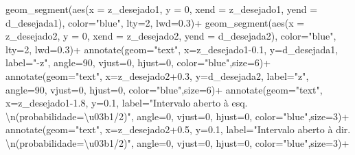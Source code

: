 \documentclass[
]{book}
\newenvironment{Shaded}{\begin{snugshade}}{\end{snugshade}}
\newcommand{\AttributeTok}[1]{\textcolor[rgb]{0.77,0.63,0.00}{#1}}
\newcommand{\DecValTok}[1]{\textcolor[rgb]{0.00,0.00,0.81}{#1}}
\newcommand{\FloatTok}[1]{\textcolor[rgb]{0.00,0.00,0.81}{#1}}
\newcommand{\FunctionTok}[1]{\textcolor[rgb]{0.00,0.00,0.00}{#1}}
\newcommand{\NormalTok}[1]{#1}
\newcommand{\SpecialCharTok}[1]{\textcolor[rgb]{0.00,0.00,0.00}{#1}}
\newcommand{\StringTok}[1]{\textcolor[rgb]{0.31,0.60,0.02}{#1}}
\begin{document}
\begin{Shaded}
\begin{Highlighting}[]
  \FunctionTok{geom\_segment}\NormalTok{(}\FunctionTok{aes}\NormalTok{(}\AttributeTok{x =}\NormalTok{ z\_desejado1, }\AttributeTok{y =} \DecValTok{0}\NormalTok{, }\AttributeTok{xend =}\NormalTok{ z\_desejado1, }\AttributeTok{yend =}\NormalTok{ d\_desejada1), }\AttributeTok{color=}\StringTok{"blue"}\NormalTok{, }\AttributeTok{lty=}\DecValTok{2}\NormalTok{, }\AttributeTok{lwd=}\FloatTok{0.3}\NormalTok{)}\SpecialCharTok{+}
  \FunctionTok{geom\_segment}\NormalTok{(}\FunctionTok{aes}\NormalTok{(}\AttributeTok{x =}\NormalTok{ z\_desejado2, }\AttributeTok{y =} \DecValTok{0}\NormalTok{, }\AttributeTok{xend =}\NormalTok{ z\_desejado2, }\AttributeTok{yend =}\NormalTok{ d\_desejada2), }\AttributeTok{color=}\StringTok{"blue"}\NormalTok{, }\AttributeTok{lty=}\DecValTok{2}\NormalTok{, }\AttributeTok{lwd=}\FloatTok{0.3}\NormalTok{)}\SpecialCharTok{+}
  \FunctionTok{annotate}\NormalTok{(}\AttributeTok{geom=}\StringTok{"text"}\NormalTok{, }\AttributeTok{x=}\NormalTok{z\_desejado1}\FloatTok{{-}0.1}\NormalTok{, }\AttributeTok{y=}\NormalTok{d\_desejada1, }\AttributeTok{label=}\StringTok{"{-}z"}\NormalTok{, }\AttributeTok{angle=}\DecValTok{90}\NormalTok{, }\AttributeTok{vjust=}\DecValTok{0}\NormalTok{, }\AttributeTok{hjust=}\DecValTok{0}\NormalTok{, }\AttributeTok{color=}\StringTok{"blue"}\NormalTok{,}\AttributeTok{size=}\DecValTok{6}\NormalTok{)}\SpecialCharTok{+}
  \FunctionTok{annotate}\NormalTok{(}\AttributeTok{geom=}\StringTok{"text"}\NormalTok{, }\AttributeTok{x=}\NormalTok{z\_desejado2}\FloatTok{+0.3}\NormalTok{, }\AttributeTok{y=}\NormalTok{d\_desejada2, }\AttributeTok{label=}\StringTok{"z"}\NormalTok{, }\AttributeTok{angle=}\DecValTok{90}\NormalTok{, }\AttributeTok{vjust=}\DecValTok{0}\NormalTok{, }\AttributeTok{hjust=}\DecValTok{0}\NormalTok{, }\AttributeTok{color=}\StringTok{"blue"}\NormalTok{,}\AttributeTok{size=}\DecValTok{6}\NormalTok{)}\SpecialCharTok{+}
  \FunctionTok{annotate}\NormalTok{(}\AttributeTok{geom=}\StringTok{"text"}\NormalTok{, }\AttributeTok{x=}\NormalTok{z\_desejado1}\FloatTok{{-}1.8}\NormalTok{, }\AttributeTok{y=}\FloatTok{0.1}\NormalTok{, }\AttributeTok{label=}\StringTok{"Intervalo aberto à esq. }\SpecialCharTok{\textbackslash{}n}\StringTok{(probabilidade=\textbackslash{}u03b1/2)"}\NormalTok{, }\AttributeTok{angle=}\DecValTok{0}\NormalTok{, }\AttributeTok{vjust=}\DecValTok{0}\NormalTok{, }\AttributeTok{hjust=}\DecValTok{0}\NormalTok{, }\AttributeTok{color=}\StringTok{"blue"}\NormalTok{,}\AttributeTok{size=}\DecValTok{3}\NormalTok{)}\SpecialCharTok{+}
  \FunctionTok{annotate}\NormalTok{(}\AttributeTok{geom=}\StringTok{"text"}\NormalTok{, }\AttributeTok{x=}\NormalTok{z\_desejado2}\FloatTok{+0.5}\NormalTok{, }\AttributeTok{y=}\FloatTok{0.1}\NormalTok{, }\AttributeTok{label=}\StringTok{"Intervalo aberto à dir. }\SpecialCharTok{\textbackslash{}n}\StringTok{(probabilidade=\textbackslash{}u03b1/2)"}\NormalTok{, }\AttributeTok{angle=}\DecValTok{0}\NormalTok{, }\AttributeTok{vjust=}\DecValTok{0}\NormalTok{, }\AttributeTok{hjust=}\DecValTok{0}\NormalTok{, }\AttributeTok{color=}\StringTok{"blue"}\NormalTok{,}\AttributeTok{size=}\DecValTok{3}\NormalTok{)}\SpecialCharTok{+}

\end{Highlighting}
\end{Shaded}
\end{document}
